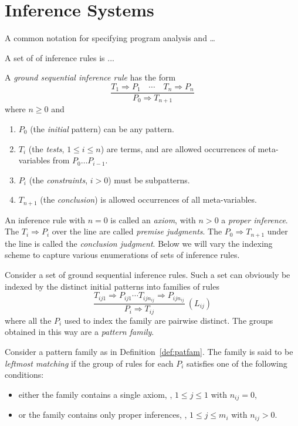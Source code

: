 \documentclass[letterpaper,11pt]{article}
\begin{document}
\section{Inference Systems}
\label{sec:infer}

A common notation for specifying program analysis and …

A set of of inference rules is ...

\begin{definition}
  A \HAX \emph{ground sequential inference rule} has the form
  \begin{equation}
    \dfrac{ T_1 ⇒ P_1 \quad\cdots\quad T_n ⇒ P_n }{ P_0 ⇒ T_{n+1} }
    \label{eq:infer}
  \end{equation}
  where $n≥0$ and
  \begin{enumerate}
  \item $P_0$ (the \emph{initial} pattern) can be any \HAX pattern.
  \item $T_i$ (the \emph{tests}, $1≤i≤n$) are \HAX terms, and are allowed occurrences of meta-variables from $P_0…P_{i-1}$.
  \item $P_i$ (the \emph{constraints}, $i>0$) must be \HAX subpatterns.
  \item $T_{n+1}$ (the \emph{conclusion}) is allowed occurrences of all meta-variables.
  \end{enumerate}
  An inference rule with $n=0$ is called an \emph{axiom}, with $n>0$ a \emph{proper inference}.
  The $T_i⇒P_i$ over the line are called \emph{premise judgments}. The $P_0⇒T_{n+1}$ under the line
  is called the \emph{conclusion judgment}.
  Below we will vary the indexing scheme to capture various enumerations of sets of inference rules.
\end{definition}

\begin{definition}\label{def:patfam}
  Consider a set of ground sequential inference rules.  Such a set can obviously be indexed by the
  distinct initial patterns into families of rules
  \begin{displaymath}
    \dfrac{ T_{ij1} ⇒ P_{ij1} \cdots T_{ijn_{ij}} ⇒ P_{ijn_{ij}} }{ P_i ⇒ T_{ij} } ~(L_{ij})
  \end{displaymath}
  where all the $P_i$ used to index the family are pairwise distinct.  The groups obtained in this
  way are a \emph{pattern family}.
\end{definition}

\begin{definition}
  Consider a pattern family as in Definition~\ref{def:patfam}.  The family is said to be
  \emph{leftmost matching} if the group of rules for each $P_i$ satisfies one of the following
  conditions:
  \begin{itemize}
  \item either the family contains a single axiom, \ie, $1≤j≤1$ with $n_{ij}=0$,
  \item or the family contains only proper inferences, \ie, $1≤j≤m_i$ with $n_{ij}>0$.
  \end{itemize}
\end{definition}
\end{document}
